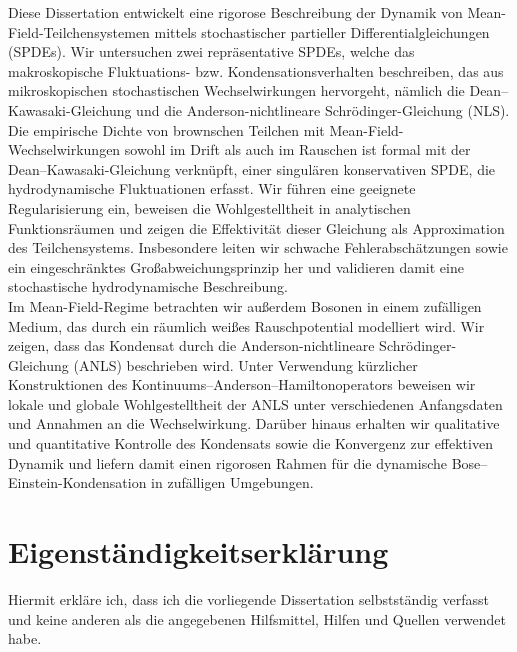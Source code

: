 \begin{abstractgermain}
   Diese Dissertation entwickelt eine rigorose Beschreibung der Dynamik von Mean-Field-Teilchensystemen mittels stochastischer partieller Differentialgleichungen (SPDEs). Wir untersuchen zwei repräsentative SPDEs, welche das makroskopische Fluktuations- bzw. Kondensationsverhalten beschreiben, das aus mikroskopischen stochastischen Wechselwirkungen hervorgeht, nämlich die Dean–Kawasaki-Gleichung und die Anderson-nichtlineare Schrödinger-Gleichung (NLS).\\

Die empirische Dichte von brownschen Teilchen mit Mean-Field-Wechselwirkungen sowohl im Drift als auch im Rauschen ist formal mit der Dean–Kawasaki-Gleichung verknüpft, einer singulären konservativen SPDE, die hydrodynamische Fluktuationen erfasst. Wir führen eine geeignete Regularisierung ein, beweisen die Wohlgestelltheit in analytischen Funktionsräumen und zeigen die Effektivität dieser Gleichung als Approximation des Teilchensystems. Insbesondere leiten wir schwache Fehlerabschätzungen sowie ein eingeschränktes Großabweichungsprinzip her und validieren damit eine stochastische hydrodynamische Beschreibung.\\

Im Mean-Field-Regime betrachten wir außerdem Bosonen in einem zufälligen Medium, das durch ein räumlich weißes Rauschpotential modelliert wird. Wir zeigen, dass das Kondensat durch die Anderson-nichtlineare Schrödinger-Gleichung (ANLS) beschrieben wird. Unter Verwendung kürzlicher Konstruktionen des Kontinuums--Anderson--Hamilton\-oper\-ators beweisen wir lokale und globale Wohlgestelltheit der ANLS unter verschiedenen Anfangsdaten und Annahmen an die Wechselwirkung. Darüber hinaus erhalten wir qualitative und quantitative Kontrolle des Kondensats sowie die Konvergenz zur effektiven Dynamik und liefern damit einen rigorosen Rahmen für die dynamische Bose–Einstein-Kondensation in zufälligen Umgebungen.
\end{abstractgermain}

\chapter*{Eigenständigkeitserklärung}

Hiermit erkläre ich, dass ich die vorliegende Dissertation selbstständig verfasst und keine anderen als die angegebenen Hilfsmittel, Hilfen und Quellen verwendet habe. \\

